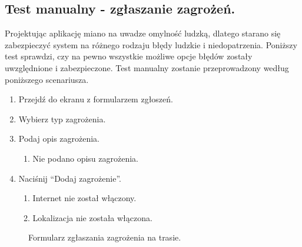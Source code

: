 \subsection*{Test manualny - zgłaszanie zagrożeń.}
Projektując aplikację miano na uwadze omylność ludzką, dlatego starano się zabezpieczyć system na różnego rodzaju błędy ludzkie i niedopatrzenia. Poniższy test sprawdzi, czy na pewno wszystkie możliwe opcje błędów zostały uwzględnione i zabezpieczone. Test manualny zostanie przeprowadzony według poniższego scenariusza.
\begin{enumerate}
    \item Przejdź do ekranu z formularzem zgłoszeń.
    \item Wybierz typ zagrożenia.
    \item Podaj opis zagrożenia.
    \begin{enumerate}
        \item Nie podano opisu zagrożenia.
    \end{enumerate}
    \item Naciśnij “Dodaj zagrożenie”.
    \begin{enumerate}
        \item Internet nie został włączony.
        \item Lokalizacja nie została włączona.
    \end{enumerate}
\end{enumerate}
\setlength{\fboxrule}{0.5pt}
\begin{figure}[H]
    \centering
    \caption{Formularz zgłaszania zagrożenia na trasie.}
    \label{test:zglos1}
\end{figure}
